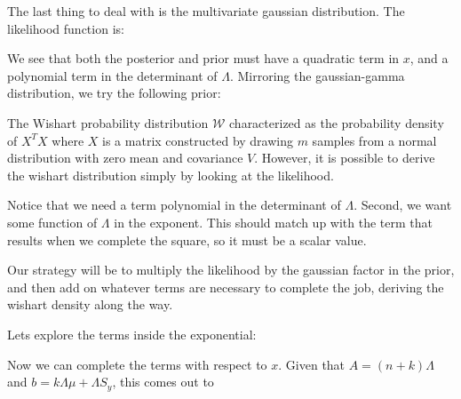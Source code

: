 \documentclass[12pt]{article}
\begin{document}
The last thing to deal with is the multivariate gaussian distribution. The likelihood function is:


We see that both the posterior and prior must have a quadratic term in $x$, and a polynomial term in the determinant of $\Lambda$. Mirroring the gaussian-gamma distribution, we try the following prior:


The Wishart probability distribution $\mathcal{W}$ characterized as the probability density of $X^TX$ where $X$ is a matrix constructed by drawing $m$ samples from a normal distribution with zero mean and covariance $V$. However, it is possible to derive the wishart distribution simply by looking at the likelihood.

Notice that we need a term polynomial in the determinant of $\Lambda$. Second, we want some function of $\Lambda$ in the exponent. This should match up with the term that results when we complete the square, so it must be a scalar value.

Our strategy will be to multiply the likelihood by the gaussian factor in the prior, and then add on whatever terms are necessary to complete the job, deriving the wishart density along the way.


Lets explore the terms inside the exponential:


Now we can complete the terms with respect to $x$. Given that $A = (n+k)\Lambda$ and $b = k\Lambda \mu + \Lambda S_y$, this comes out to
\end{document}
